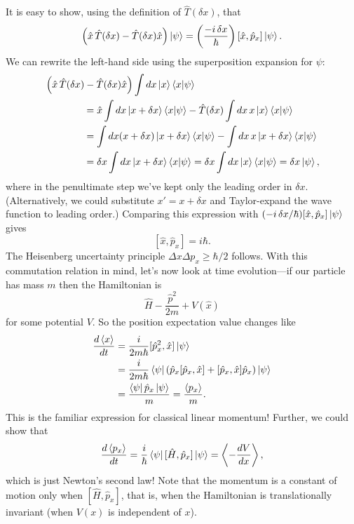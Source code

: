 \documentclass[../p116main.tex]{subfiles}
\begin{document}
It is easy to show, using the definition of $\hat T(\delta x)$, that
\[ \left( \hat x \, \hat T(\delta x) - \hat T(\delta x) \hat x \right) \left| \psi \right> = \left( \frac{-i \,\delta x}{\hbar} \right) [\hat x, \hat p_x] \left| \psi \right>. \]
We can rewrite the left-hand side using the superposition expansion for $\psi$:
\begin{align*}
    & \left( \hat x \, \hat T(\delta x) - \hat T(\delta x) \hat x \right) \int dx \left| x \right> \left< x \middle| \psi \right> \\
    &\qquad\qquad = \hat x \int dx \left| x + \delta x \right> \left< x \middle| \psi \right> - \hat T(\delta x) \int dx \, x \left| x \right> \left< x \middle| \psi \right> \\
    &\qquad\qquad = \int dx (x + \delta x) \left| x + \delta x \right> \left< x \middle| \psi \right> - \int dx \, x \left| x + \delta x \right> \left< x \middle| \psi \right> \\
    &\qquad\qquad = \delta x \int dx \left| x + \delta x \right> \left< x \middle| \psi \right> = \delta x \int dx \left| x \right> \left< x \middle| \psi \right> = \delta x \left| \psi \right>,
\end{align*}
where in the penultimate step we've kept only the leading order in $\delta x$.
(Alternatively, we could substitute $x' = x + \delta x$ and Taylor-expand the wave function to leading order.)
Comparing this expression with $(-i \, \delta x / \hbar) [\hat x, \hat p_x] \left| \psi \right>$ gives
\[ [\hat x, \hat p_x] = i\hbar. \]
The Heisenberg uncertainty principle $\Delta x \Delta p_x \geq \hbar / 2$ follows.
With this commutation relation in mind, let's now look at time evolution---if our particle has mass $m$ then the Hamiltonian is
\[ \hat H - \frac{\hat p^2}{2m} + V(\hat x) \]
for some potential $V$.
So the position expectation value changes like
\begin{align*}
    \frac{d \left< x \right>}{dt} &= \frac{i}{2m\hbar} [\hat p_x^2, \hat x] \left| \psi \right> \\
    &= \frac{i}{2m\hbar} \left< \psi \right| \left( \hat p_x [\hat p_x, \hat x] + [\hat p_x, \hat x] \hat p_x \right) \left| \psi \right> \\
    &= \frac{\left< \psi \right| \hat p_x \left| \psi \right>}{m} = \frac{\left< p_x \right>}{m}.
\end{align*}
This is the familiar expression for classical linear momentum!
Further, we could show that
\[ \frac{d \left< p_x \right>}{dt} = \frac{i}{\hbar} \left< \psi \right| [\hat H, \hat p_x] \left| \psi \right> = \left< -\frac{dV}{dx} \right>, \]
which is just Newton's second law!
Note that the momentum is a constant of motion only when $[\hat H, \hat p_x]$, that is, when the Hamiltonian is translationally invariant (when $V(x)$ is independent of $x$).
\end{document}
